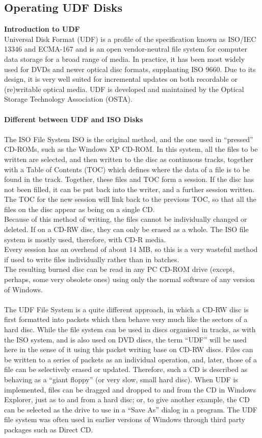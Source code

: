 \subsection{Operating UDF Disks}
{\bf Introduction to UDF}\\
Universal Disk Format (UDF) is a profile of the specification known as ISO/IEC 13346 and ECMA-167 and is an open vendor-neutral file system for computer data storage for a broad range of media. In practice, it has been most widely used for DVDs and newer optical disc formats, supplanting ISO 9660. Due to its design, it is very well suited for incremental updates on both recordable or (re)writable optical media. UDF is developed and maintained by the Optical Storage Technology Association (OSTA).\\\\
{\bf Different between UDF and ISO Disks}\\\\
The ISO File System ISO is the original method, and the one used in “pressed” CD-ROMs, such as the Windows XP CD-ROM. In this system, all the files to be written are selected, and then written to the disc as continuous tracks, together with a Table of Contents (TOC) which defines where the data of a file is to be found in the track. Together, these files and TOC form a session. If the disc has not been filled, it can be put back into the writer, and a further session written. The TOC for the new session will link back to the previous TOC, so that all the files on the disc appear as being on a single CD.\\
Because of this method of writing, the files cannot be individually changed or deleted. If on a CD-RW disc, they can only be erased as a whole. The ISO file system is mostly used, therefore, with CD-R media.\\
Every session has an overhead of about 14 MB, so this is a very wasteful method if used to write files individually rather than in batches.\\
The resulting burned disc can be read in any PC CD-ROM drive (except, perhaps, some very obsolete ones) using only the normal software of any version of Windows. \\\\
The UDF File System is a quite different approach, in which a CD-RW disc is first formatted into packets which then behave very much like the sectors of a hard disc. While the file system can be used in discs organised in tracks, as with the ISO system, and is also used on DVD discs, the term “UDF” will be used here in the sense of it using this packet writing base on CD-RW discs. Files can be written to a series of packets as an individual operation, and, later, those of a file can be selectively erased or updated. Therefore, such a CD is described as behaving as a “giant floppy” (or very slow, small hard disc). When UDF is implemented, files can be dragged and dropped to and from the CD in Windows Explorer, just as to and from a hard disc; or, to give another example, the CD can be selected as the drive to use in a “Save As” dialog in a program. The UDF file system was often used in earlier versions of Windows through third party packages such as Direct CD.\\
